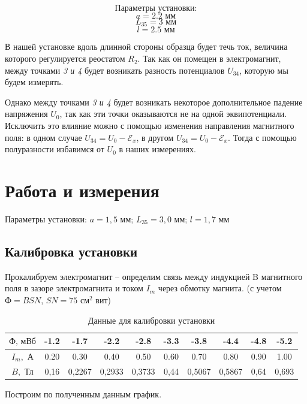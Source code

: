 \documentclass[a4paper, 12pt]{article}
\begin{document}
		$$\text{Параметры установки:}$$
$$a = 2.2 \text{ мм}$$
$$L_{35} = 3 \text{ мм}$$
$$l = 2.5 \text{ мм}$$
\vspace{5 cm}

В нашей установке вдоль длинной стороны образца будет течь ток, величина которого регулируется реостатом $R_2$. Так как он помещен в электромагнит, между точками \textit{3 и 4} будет возникать разность потенциалов $U_{34}$, которую мы будем измерять. 

Однако между точками \textit{3 и 4} будет возникать некоторое дополнительное падение напряжения $U_{0}$, так как эти точки оказываются не на одной эквипотенциали. Исключить это влияние можно с помощью изменения направления магнитного поля: в одном случае $U_{34} = U_{0} - \mathscr{E}_x $, в другом  $U_{34} = U_0 - \mathscr{E}_x $. Тогда с помощью полуразности избавимся от $U_{0}$ в наших измерениях. 

\section{Работа и измерения}
Параметры установки:
$a = 1,5 \text{ мм}$; 
$L_{35} = 3,0 \text{ мм}$;
$l = 1,7 \text{ мм}$
\subsection*{Калибровка установки}

Прокалибруем электромагнит -- определим связь между индукцией B магнитного поля в зазоре электромагнита и током $I_m$ через обмотку магнита. (с учетом $\text{Ф} = BSN$, $SN = 75$ $\text{см}^2$ вит)


\begin{table}[H]
\centering
\begin{tabular}{|c|c|c|c|c|c|c|c|c|c|}
\hline
$\text{Ф, мВб}$&-1.2&-1.7&-2.2&-2.8&-3.3&-3.8&-4.4&-4.8&-5.2\\ \hline
$I_m, \text{ А}$ & 0.20    & 0.30   & 0.40 & 0.50   & 0.60   & 0.70     & 0.80    &0.90  & 1.00 \\ \hline
$B, \text{ Тл}$ & 0,16&0,2267&0,2933&0,3733&0,44&0,5067&0,5867&0,64&0,693\\ \hline
\end{tabular}
\caption{Данные для калибровки установки}
\end{table}

Построим по полученным данным график.
\end{document}
